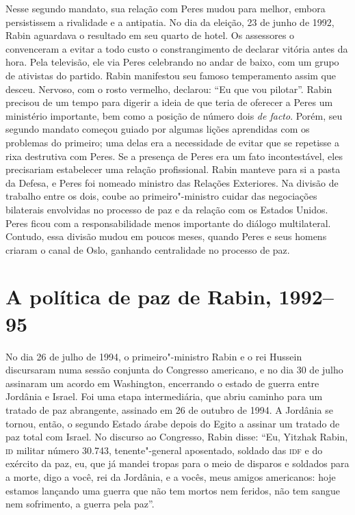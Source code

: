 Nesse segundo mandato, sua relação com Peres mudou para melhor, embora
persistissem a rivalidade e a antipatia. No dia da eleição, 23 de junho
de 1992, Rabin aguardava o resultado em seu quarto de hotel. Os
assessores o convenceram a evitar a todo custo o constrangimento de
declarar vitória antes da hora. Pela televisão, ele via Peres celebrando no
andar de baixo, com um grupo de ativistas do partido. Rabin manifestou
seu famoso temperamento assim que desceu. Nervoso, com o rosto vermelho,
declarou: ``Eu que vou pilotar''. Rabin precisou de um tempo para
digerir a ideia de que teria de oferecer a Peres um ministério
importante, bem como a posição de número dois \emph{de facto}. Porém,
seu segundo mandato começou guiado por algumas lições aprendidas com os
problemas do primeiro; uma delas era a necessidade de evitar que se
repetisse a rixa destrutiva com Peres. Se a presença de Peres era um
fato incontestável, eles precisariam estabelecer uma relação
profissional. Rabin manteve para si a pasta da Defesa, e Peres foi
nomeado ministro das Relações Exteriores. Na divisão de trabalho entre
os dois, coube ao primeiro"-ministro cuidar das negociações bilaterais
envolvidas no processo de paz e da relação com os Estados Unidos. Peres
ficou com a responsabilidade menos importante do diálogo multilateral.
Contudo, essa divisão mudou em poucos meses, quando Peres e seus
homens criaram o canal de Oslo, ganhando centralidade no processo de
paz.

\chapter[A política de paz de Rabin, 1992--95]{A política de paz de Rabin, 1992--95}

No dia 26 de julho de 1994, o primeiro"-ministro Rabin e o rei Hussein
discursaram numa sessão conjunta do Congresso americano, e no dia 30 de
julho assinaram um acordo em Washington, encerrando o estado de guerra
entre Jordânia e Israel. Foi uma etapa intermediária, que abriu caminho
para um tratado de paz abrangente, assinado em 26 de outubro de 1994. A
Jordânia se tornou, então, o segundo Estado árabe depois do Egito a
assinar um tratado de paz total com Israel. No discurso ao Congresso,
Rabin disse: ``Eu, Yitzhak Rabin, \textsc{id} militar número 30.743,
tenente"-general aposentado, soldado das \textsc{idf} e do exército da paz, eu,
que já mandei tropas para o meio de disparos e soldados para a morte,
digo a você, rei da Jordânia, e a vocês, meus amigos americanos: hoje
estamos lançando uma guerra que não tem mortos nem feridos, não tem
sangue nem sofrimento, a guerra pela paz''.

